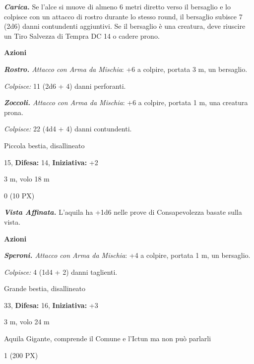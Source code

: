 \begin{multicols}{2}
{\emph{\textbf{Carica.}} Se l'alce si muove di almeno 6 metri diretto verso il bersaglio e lo colpisce con un attacco di rostro durante lo stesso round, il bersaglio subisce 7 (2d6) danni contundenti aggiuntivi. Se il bersaglio è una creatura, deve riuscire un Tiro Salvezza di Tempra DC 14 o cadere prono.

\textbf{Azioni}

\emph{\textbf{Rostro.} Attacco con Arma da Mischia}: +6 a colpire, portata 3 m, un bersaglio.

\emph{Colpisce:} 11 (2d6 + 4) danni perforanti.

\emph{\textbf{Zoccoli.} Attacco con Arma da Mischia}: +6 a colpire, portata 1 m, una creatura prona.

\emph{Colpisce:} 22 (4d4 + 4) danni contundenti.

\begin{description}[noitemsep, topsep=0pt, parsep=0pt, partopsep=0pt, leftmargin=0cm, labelwidth=2.2cm]
	\item[\textbf{Taglia/Tipo:}] Piccola bestia, disallineato
	\item[\textbf{Caratt.:}] 
    \item[\textbf{Tiri Salvez.:}] 
	\item[\textbf{Punti Ferita:}] 15,  \textbf{Difesa:} 14,  \textbf{Iniziativa:} +2
	\item[\textbf{Movimento:}] 3 m, volo 18 m
	\item[\textbf{Sfida:}] 0 (10 PX)\smallskip
\end{description}

\emph{\textbf{Vista Affinata.}} L'aquila ha +1d6 nelle prove di Consapevolezza basate sulla vista.

\textbf{Azioni}

\emph{\textbf{Speroni.} Attacco con Arma da Mischia}: +4 a colpire, portata 1 m, un bersaglio.

\emph{Colpisce:} 4 (1d4 + 2) danni taglienti.

\begin{description}[noitemsep, topsep=0pt, parsep=0pt, partopsep=0pt, leftmargin=0cm, labelwidth=2.2cm]
	\item[\textbf{Taglia/Tipo:}] Grande bestia, disallineato
	\item[\textbf{Caratt.:}] 
    \item[\textbf{Tiri Salvez.:}] 
	\item[\textbf{Punti Ferita:}] 33,  \textbf{Difesa:} 16,  \textbf{Iniziativa:} +3
	\item[\textbf{Movimento:}] 3 m, volo 24 m
	\item[\textbf{Linguaggi:}] Aquila Gigante, comprende il Comune e l'Ictun ma non può parlarli
	\item[\textbf{Sfida:}] 1 (200 PX)\smallskip
\end{description}

}
\end{multicols}
